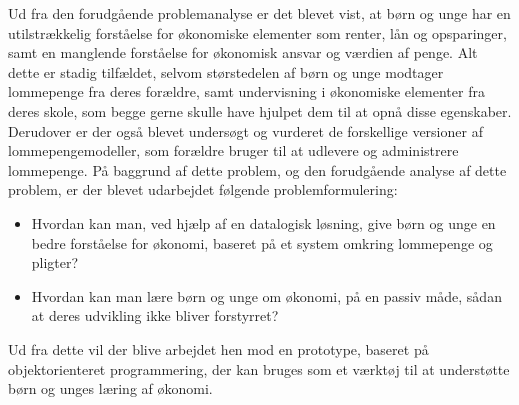 Ud fra den forudgående problemanalyse er det blevet vist, at børn og unge har en utilstrækkelig forståelse for økonomiske elementer som renter, lån og opsparinger, samt en manglende forståelse for økonomisk ansvar og værdien af penge. Alt dette er stadig tilfældet, selvom størstedelen af børn og unge modtager lommepenge fra deres forældre, samt undervisning i økonomiske elementer fra deres skole, som begge gerne skulle have hjulpet dem til at opnå disse egenskaber. Derudover er der også blevet undersøgt og vurderet de forskellige versioner af lommepengemodeller, som forældre bruger til at udlevere og administrere lommepenge. På baggrund af dette problem, og den forudgående analyse af dette problem, er der blevet udarbejdet følgende problemformulering:

\begin{itemize}
\item Hvordan kan man, ved hjælp af en datalogisk løsning, give børn og unge en bedre forståelse for økonomi, baseret på et system omkring lommepenge og pligter?
\item Hvordan kan man lære børn og unge om økonomi, på en passiv måde, sådan at deres udvikling ikke bliver forstyrret?
\end{itemize}

Ud fra dette vil der blive arbejdet hen mod en prototype, baseret på objektorienteret programmering, der kan bruges som et værktøj til at understøtte børn og unges læring af økonomi.
